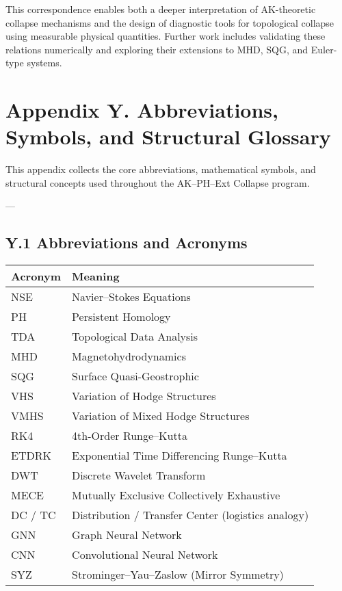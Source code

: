 \documentclass[11pt]{article}
\theoremstyle{definition}
\begin{document}
This correspondence enables both a deeper interpretation of AK-theoretic collapse mechanisms and the design of diagnostic tools for topological collapse using measurable physical quantities.  
Further work includes validating these relations numerically and exploring their extensions to MHD, SQG, and Euler-type systems.


\section*{Appendix Y. Abbreviations, Symbols, and Structural Glossary}

This appendix collects the core abbreviations, mathematical symbols, and structural concepts used throughout the AK–PH–Ext Collapse program.

---

\subsection*{Y.1 Abbreviations and Acronyms}

\begin{tabular}{ll}
\textbf{Acronym} & \textbf{Meaning} \\
\hline
NSE & Navier–Stokes Equations \\
PH & Persistent Homology \\
TDA & Topological Data Analysis \\
MHD & Magnetohydrodynamics \\
SQG & Surface Quasi-Geostrophic \\
VHS & Variation of Hodge Structures \\
VMHS & Variation of Mixed Hodge Structures \\
RK4 & 4th-Order Runge–Kutta \\
ETDRK & Exponential Time Differencing Runge–Kutta \\
DWT & Discrete Wavelet Transform \\
MECE & Mutually Exclusive Collectively Exhaustive \\
DC / TC & Distribution / Transfer Center (logistics analogy) \\
GNN & Graph Neural Network \\
CNN & Convolutional Neural Network \\
SYZ & Strominger–Yau–Zaslow (Mirror Symmetry) \\
\end{tabular}
\end{document}
